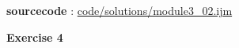 \textbf{sourcecode} : \href{http://www.example.com/contents}{code/solutions/module3\_02.ijm}

\item \textbf{Exercise 4}
